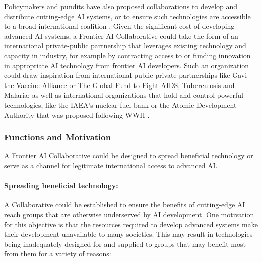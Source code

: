 \documentclass[12pt]{article}
\begin{document}
Policymakers and pundits have also proposed collaborations to develop
and distribute cutting-edge AI systems, or to ensure such technologies
are accessible to a broad international coalition \cite{hogarth_we_2023, kakkad_new_2023, spirling_why_2023, schmidt_nscai_2021}. Given the significant cost of developing advanced AI systems, a Frontier
AI Collaborative could take the form of an international private-public
partnership that leverages existing technology and capacity in industry,
for example by contracting access to or funding innovation in
appropriate AI technology from frontier AI developers. Such an
organization could draw inspiration from international public-private
partnerships like Gavi - the Vaccine Alliance or The Global Fund to
Fight AIDS, Tuberculosis and Malaria; as well as international
organizations that hold and control powerful technologies, like the
IAEA's nuclear fuel bank \cite{rauf_atoms_2015}
or the Atomic Development Authority that was proposed following
WWII \cite{zaidi_international_2019}.


\subsubsection*{Functions and
Motivation}

A Frontier AI Collaborative could be designed to spread beneficial
technology or serve as a channel for legitimate international access to
advanced AI.

\paragraph{Spreading beneficial technology:} A Collaborative could be
established to ensure the benefits of cutting-edge AI reach groups that
are otherwise underserved by AI development. One motivation for this
objective is that the resources required to develop advanced systems
make their development unavailable to many societies. This may result in
technologies being inadequately designed for and supplied to groups that
may benefit most from them for a variety of reasons:
\end{document}
